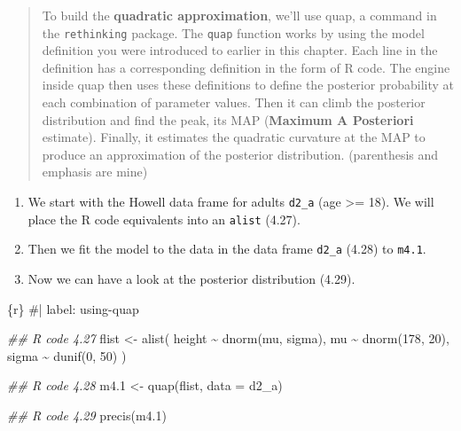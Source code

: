 \documentclass[
  letterpaper,
  DIV=11,
  numbers=noendperiod]{scrreprt}
\newenvironment{Shaded}{\begin{snugshade}}{\end{snugshade}}
\newcommand{\AttributeTok}[1]{\textcolor[rgb]{0.40,0.45,0.13}{#1}}
\newcommand{\CommentTok}[1]{\textcolor[rgb]{0.37,0.37,0.37}{#1}}
\newcommand{\DecValTok}[1]{\textcolor[rgb]{0.68,0.00,0.00}{#1}}
\newcommand{\DocumentationTok}[1]{\textcolor[rgb]{0.37,0.37,0.37}{\textit{#1}}}
\newcommand{\FloatTok}[1]{\textcolor[rgb]{0.68,0.00,0.00}{#1}}
\newcommand{\FunctionTok}[1]{\textcolor[rgb]{0.28,0.35,0.67}{#1}}
\newcommand{\InformationTok}[1]{\textcolor[rgb]{0.37,0.37,0.37}{#1}}
\newcommand{\NormalTok}[1]{\textcolor[rgb]{0.00,0.23,0.31}{#1}}
\newcommand{\OtherTok}[1]{\textcolor[rgb]{0.00,0.23,0.31}{#1}}
\newcommand{\SpecialCharTok}[1]{\textcolor[rgb]{0.37,0.37,0.37}{#1}}
\providecommand{\tightlist}{%
  \setlength{\itemsep}{0pt}\setlength{\parskip}{0pt}}\usepackage{longtable,booktabs,array}
\begin{document}
\begin{quote}
To build the \textbf{quadratic approximation}, we'll use quap, a command
in the \texttt{rethinking} package. The \texttt{quap} function works by
using the model definition you were introduced to earlier in this
chapter. Each line in the definition has a corresponding definition in
the form of R code. The engine inside quap then uses these definitions
to define the posterior probability at each combination of parameter
values. Then it can climb the posterior distribution and find the peak,
its MAP (\textbf{Maximum A Posteriori} estimate). Finally, it estimates
the quadratic curvature at the MAP to produce an approximation of the
posterior distribution. (parenthesis and emphasis are mine)
\end{quote}

\begin{enumerate}
\def\labelenumi{\arabic{enumi}.}
\tightlist
\item
  We start with the Howell data frame for adults \texttt{d2\_a} (age
  \textgreater= 18). We will place the R code equivalents into an
  \texttt{alist} (4.27).
\item
  Then we fit the model to the data in the data frame \texttt{d2\_a}
  (4.28) to \texttt{m4.1}.
\item
  Now we can have a look at the posterior distribution (4.29).
\end{enumerate}

\begin{Shaded}
\begin{Highlighting}[]
\InformationTok{\textasciigrave{}\textasciigrave{}\textasciigrave{}\{r\}}
\CommentTok{\#| label: using{-}quap}

\DocumentationTok{\#\# R code 4.27}
\NormalTok{flist }\OtherTok{\textless{}{-}} \FunctionTok{alist}\NormalTok{(}
\NormalTok{  height }\SpecialCharTok{\textasciitilde{}} \FunctionTok{dnorm}\NormalTok{(mu, sigma),}
\NormalTok{  mu }\SpecialCharTok{\textasciitilde{}} \FunctionTok{dnorm}\NormalTok{(}\DecValTok{178}\NormalTok{, }\DecValTok{20}\NormalTok{),}
\NormalTok{  sigma }\SpecialCharTok{\textasciitilde{}} \FunctionTok{dunif}\NormalTok{(}\DecValTok{0}\NormalTok{, }\DecValTok{50}\NormalTok{)}
\NormalTok{)}

\DocumentationTok{\#\# R code 4.28}
\NormalTok{m4}\FloatTok{.1} \OtherTok{\textless{}{-}} \FunctionTok{quap}\NormalTok{(flist, }\AttributeTok{data =}\NormalTok{ d2\_a)}

\DocumentationTok{\#\# R code 4.29}
\FunctionTok{precis}\NormalTok{(m4}\FloatTok{.1}\NormalTok{)}
\InformationTok{\textasciigrave{}\textasciigrave{}\textasciigrave{}}
\end{Highlighting}
\end{Shaded}
\end{document}
